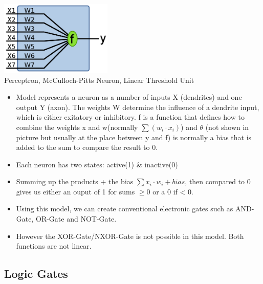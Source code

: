 \documentclass[english,11pt]{article}
\begin{document}
\includegraphics[width=0.4\textwidth]{perceptron.png}\\
Perceptron, McCulloch-Pitts Neuron, Linear Threshold Unit\\
\begin{itemize}
\item Model represents a neuron as a number of inputs X (dendrites) and one output Y (axon). The weights W determine the influence of a dendrite input, which is either exitatory or inhibitory. f is a function that defines how to combine the weights x and w(normally $\sum (w_i \cdot x_i)$) and $\theta$ (not shown in picture but usually at the place between y and f) is normally a bias that is added to the sum to compare the result to 0.
\item Each neuron has two states: active(1) \& inactive(0)
\item Summing up the products + the bias $\sum x_i\cdot w_i + bias$, then compared to 0 gives us either an ouput of 1 for sums $\ge 0$ or a 0 if < 0.
\item Using this model, we can create conventional electronic gates such as AND-Gate, OR-Gate and NOT-Gate. 
\item However the XOR-Gate/NXOR-Gate is not possible in this model. Both functions are not linear.
\end{itemize}


\subsection{Logic Gates}
\end{document}
